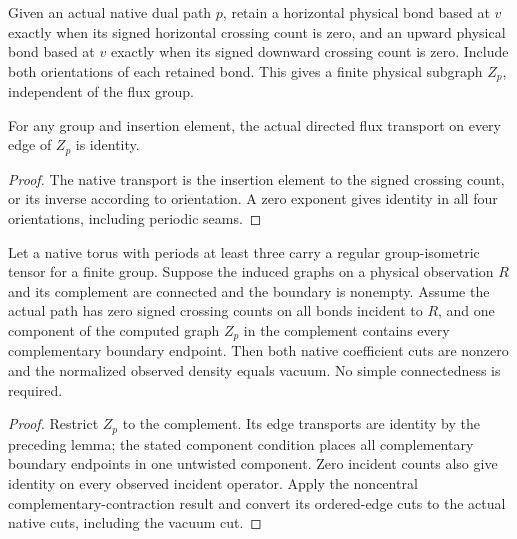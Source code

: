 \begin{definition}
    \label{def:peps_zero_crossing_graph}
    \leanok
    Given an actual native dual path $p$, retain a horizontal physical bond
    based at $v$ exactly when its signed horizontal crossing count is zero,
    and an upward physical bond based at $v$ exactly when its signed downward
    crossing count is zero. Include both orientations of each retained bond.
    This gives a finite physical subgraph $Z_p$, independent of the flux group.
\end{definition}

\begin{lemma}
    \label{lem:peps_zero_crossing_transport}
    \leanok
    For any group and insertion element, the actual directed flux transport
    on every edge of $Z_p$ is identity.
\end{lemma}
\begin{proof}\leanok
    The native transport is the insertion element to the signed crossing
    count, or its inverse according to orientation. A zero exponent gives
    identity in all four orientations, including periodic seams.
\end{proof}

\begin{lemma}
    \label{lem:peps_zero_crossing_density}
    \leanok
    Let a native torus with periods at least three carry a regular
    group-isometric tensor for a finite group. Suppose the induced graphs
    on a physical observation $R$ and its complement are connected and the
    boundary is nonempty. Assume the actual path has zero signed crossing
    counts on all bonds incident to $R$, and one component of the computed
    graph $Z_p$ in the complement contains every complementary boundary
    endpoint. Then both native coefficient cuts are nonzero and the normalized
    observed density equals vacuum. No simple connectedness is required.
\end{lemma}
\begin{proof}\leanok
    Restrict $Z_p$ to the complement. Its edge transports are identity by the
    preceding lemma; the stated component condition places all complementary
    boundary endpoints in one untwisted component. Zero incident counts also
    give identity on every observed incident operator. Apply the noncentral
    complementary-contraction result and convert its ordered-edge cuts to
    the actual native cuts, including the vacuum cut.
\end{proof}
